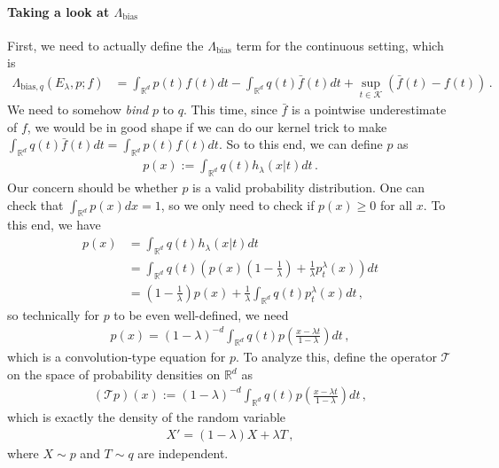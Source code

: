 \documentclass{article}
\theoremstyle{plain}
\theoremstyle{definition}
\theoremstyle{plain}
\newcommand{\Rd}{\mathbb{R}^d}
\newcommand{\K}{\mathcal K}
\newcommand{\cT}{\mathcal T}
\begin{document}
\paragraph{Taking a look at $\Lambda_{\mathrm{bias}}$}
First, we need to actually define the $\Lambda_{\mathrm{bias}}$ term for the continuous setting, which is
\begin{align}
    \Lambda_{\mathrm{bias}, q}(E_\lambda, p; f)
     & =
    \int_{\Rd} p(t) f(t) dt - \int_{\Rd} q(t) \bar{f}(t) dt + \sup_{t\in \K} (\bar{f}(t) - f(t))\,.
\end{align}
We need to somehow \textit{bind} $p$ to $q$.
This time, since $\bar{f}$ is a pointwise underestimate of $f$, we would be in good shape
if we can do our kernel trick to make $\int_{\Rd} q(t) \bar{f}(t) dt = \int_{\Rd} p(t) f(t) dt$.
So to this end, we can define $p$ as
\begin{align}
    p(x) := \int_{\Rd} q(t) h_\lambda(x|t) dt\,.
\end{align}
Our concern should be whether $p$ is a valid probability distribution.
One can check that $\int_{\Rd} p(x) dx = 1$, so we only need to check if $p(x)\ge 0$ for all $x$.
To this end, we have
\begin{align}
    p(x) & = \int_{\Rd} q(t) h_\lambda(x|t) dt                                                                          \\
         & = \int_{\Rd} q(t) \left(p(x) \left(1 - \frac{1}{\lambda}\right) + \frac{1}{\lambda}p_t^\lambda(x) \right) dt \\
         & = \left(1 - \frac{1}{\lambda}\right) p(x)
    +
    \frac{1}{\lambda} \int_{\Rd} q(t) p_t^\lambda\left(x\right) dt\,,
\end{align}
so technically for $p$ to be even well-defined, we need
\begin{align}
    p(x) = (1 - \lambda)^{-d} \int_{\Rd} q(t) p\left(\frac{x - \lambda t}{1 - \lambda}\right) dt\,,
\end{align}
which is a convolution-type equation for $p$.
To analyze this, define the operator $\cT$ on the space of probability densities on $\Rd$ as
\begin{align}
    (\cT p)(x) := (1 - \lambda)^{-d} \int_{\Rd} q(t) p\left(\frac{x - \lambda t}{1 - \lambda}\right) dt\,,
\end{align}
which is exactly the density of the random variable
\begin{align}
    X' = (1-\lambda) X + \lambda T\,,
\end{align}
where $X\sim p$ and $T\sim q$ are independent.
\end{document}
